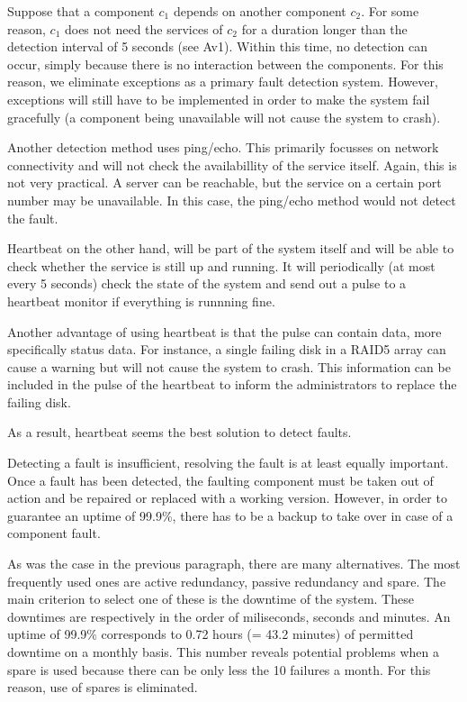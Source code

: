 \npar Suppose that a component $c_1$ depends on another component $c_2$. For
some reason, $c_1$ does not need the services of $c_2$ for a duration longer
than the detection interval of 5 seconds (see Av1). Within this time, no
detection can occur, simply because there is no interaction between the
components. For this reason, we eliminate exceptions as a primary fault
detection system. However, exceptions will still have to be implemented in order
to make the system fail gracefully (a component being unavailable will not
cause the system to crash).

\npar Another detection method uses ping/echo. This primarily focusses on
network connectivity and will not check the availabillity of the service itself.
Again, this is not very practical. A server can be reachable, but the service on
a certain port number may be unavailable. In this case, the ping/echo
method would not detect the fault. 

\npar Heartbeat on the other hand, will be part of the system itself and will be
able to check whether the service is still up and running. It will periodically
(at most every 5 seconds) check the state of the system and send out a pulse
to a heartbeat monitor if everything is runnning fine.

\npar Another advantage of using heartbeat is that the pulse can contain data,
more specifically status data. For instance, a single failing disk in a RAID5
array can cause a warning but will not cause the system to crash. This
information can be included in the pulse of the heartbeat to inform the
administrators to replace the failing disk.

\npar As a result, heartbeat seems the best solution to detect faults. 

\npar Detecting a fault is insufficient, resolving the fault is at least equally
important. Once a fault has been detected, the faulting component must be taken
out of action and be repaired or replaced with a working version. However, in
order to guarantee an uptime of 99.9\%, there has to be a backup to take over in
case of a component fault.

\npar As was the case in the previous paragraph, there are many alternatives.
The most frequently used ones are active redundancy, passive redundancy and
spare. The main criterion to select one of these is the downtime of the system.
These downtimes are respectively in the order of miliseconds, seconds and
minutes. An uptime of 99.9\% corresponds to 0.72 hours (= 43.2 minutes) of
permitted downtime on a monthly basis. This number reveals potential problems
when a spare is used because there can be only less the 10 failures a month. For
this reason, use of spares is eliminated.

